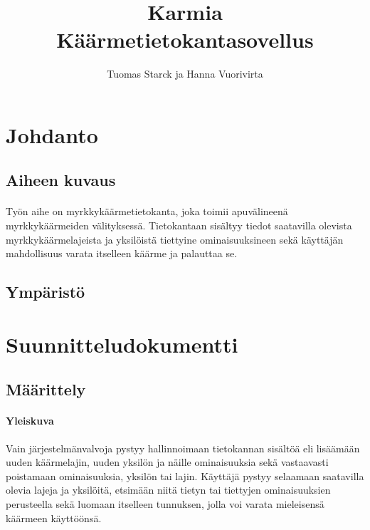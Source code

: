 \documentclass[11pt]{article}
\begin{document}
\title{\Huge{\bf Karmia} \\ \large{Käärmetietokantasovellus}}
\author{Tuomas Starck ja Hanna Vuorivirta}
\maketitle

\vspace{4em}

\section{Johdanto} %

\subsection{Aiheen kuvaus} %

\paragraph{} Työn aihe on myrkkykäärmetietokanta, joka toimii apuvälineenä myrkkykäärmeiden välityksessä. Tietokantaan sisältyy tiedot saatavilla olevista myrkkykäärmelajeista ja yksilöistä tiettyine ominaisuuksineen sekä käyttäjän mahdollisuus varata itselleen käärme ja palauttaa se.

\subsection{Ympäristö} %

\section{Suunnitteludokumentti} %

\subsection{Määrittely} %

\paragraph{Yleiskuva} Vain järjestelmänvalvoja pystyy hallinnoimaan tietokannan sisältöä eli lisäämään uuden käärmelajin, uuden yksilön ja näille ominaisuuksia sekä vastaavasti poistamaan ominaisuuksia, yksilön tai lajin. Käyttäjä pystyy selaamaan saatavilla olevia lajeja ja yksilöitä, etsimään niitä tietyn tai tiettyjen ominaisuuksien perusteella sekä luomaan itselleen tunnuksen, jolla voi varata mieleisensä käärmeen käyttöönsä.
\end{document}
